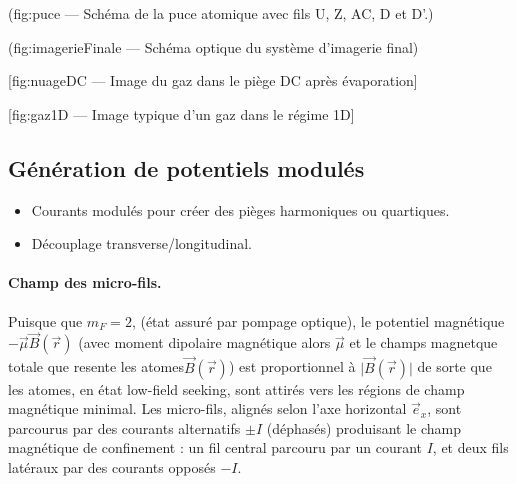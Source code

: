 \begin{center}
	({fig:puce} — Schéma de la puce atomique avec fils U, Z, AC, D et D'.)
\end{center}
\begin{center}
	({fig:imagerieFinale} — Schéma optique du système d’imagerie final)
\end{center}
\begin{center}
	[{fig:nuageDC} — Image du gaz dans le piège DC après évaporation]
\end{center}
\begin{center}
	[{fig:gaz1D} — Image typique d’un gaz dans le régime 1D]
\end{center}



\subsection{Génération de potentiels modulés}
\begin{itemize}
    \item Courants modulés pour créer des pièges harmoniques ou quartiques.
    \item Découplage transverse/longitudinal.
\end{itemize}

\paragraph{Champ des micro-fils.}
Puisque que $m_F = 2 $, (état assuré par pompage optique), le potentiel magnétique $-\vec{\mu} \vec{B}(\vec{r}) $ (avec moment dipolaire magnétique alors $\vec{\mu}$ et le champs magnetque totale que resente les atomes$\vec{B}(\vec{r})$) est proportionnel à $\vert \vec{B}(\vec{r}) \vert$  de sorte que les atomes, en état low-field seeking, sont attirés vers les régions de champ magnétique minimal. Les micro-fils, alignés selon l’axe horizontal $\vec{e}_x$, sont parcourus par des courants alternatifs $\pm I$ (déphasés) produisant le champ magnétique de confinement : un fil central parcouru par un courant \( I \), et deux fils latéraux par des courants opposés \(-I\). 

